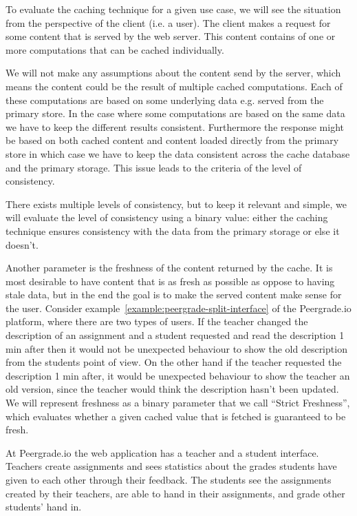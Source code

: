 

To evaluate the caching technique for a given use case, we will see the situation from the perspective of the client (i.e. a user). The client makes a request for some content that is served by the web server. This content contains of one or more computations that can be cached individually.


We will not make any assumptions about the content send by the server, which means the content could be the result of multiple cached computations. Each of these computations are based on some underlying data e.g. served from the primary store. In the case where some computations are based on the same data we have to keep the different results consistent. Furthermore the response might be based on both cached content and content loaded directly from the primary store in which case we have to keep the data consistent across the cache database and the primary storage. This issue leads to the criteria of the level of consistency.

There exists multiple levels of consistency, but to keep it relevant and simple, we will evaluate the level of consistency using a binary value: either the caching technique ensures consistency with the data from the primary storage or else it doesn't.


Another parameter is the freshness of the content returned by the cache. It is most desirable to have content that is as fresh as possible as oppose to having stale data, but in the end the goal is to make the served content make sense for the user. Consider example~\ref{example:peergrade-split-interface} of the Peergrade.io platform, where there are two types of users. If the teacher changed the description of an assignment and a student requested and read the description 1 min after then it would not be unexpected behaviour to show the old description from the students point of view. On the other hand if the teacher requested the description 1 min after, it would be unexpected behaviour to show the teacher an old version, since the teacher would think the description hasn't been updated. We will represent freshness as a binary parameter that we call ``Strict Freshness'', which evaluates whether a given cached value that is fetched is guaranteed to be fresh.

\begin{example}
\label{example:peergrade-split-interface}
At Peergrade.io the web application has a teacher and a student interface. Teachers create assignments and sees statistics about the grades students have given to each other through their feedback. The students see the assignments created by their teachers, are able to hand in their assignments, and grade other students' hand in.
\end{example}


